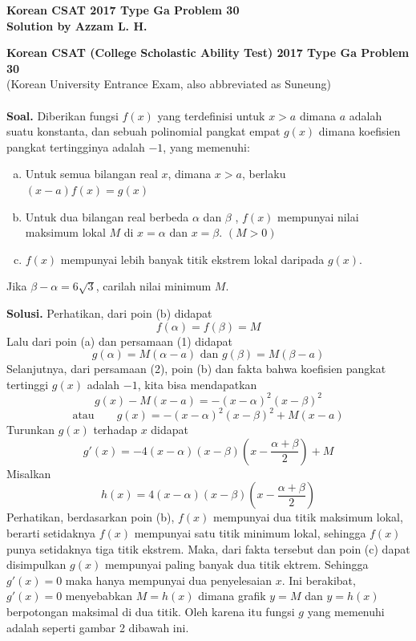 	\begin{center}
    \textbf{\Huge Korean CSAT 2017 Type Ga Problem 30}\\
    \textbf{\large Solution by Azzam L. H.}
\end{center}
 
	\begin{framed}
		\textbf{Korean CSAT (College Scholastic Ability Test) 2017 Type Ga Problem 30}\\ (Korean University Entrance Exam, also abbreviated as Suneung)\\
		\\
		\textbf{Soal. }Diberikan fungsi $f(x)$ yang  terdefinisi untuk $x>a$ dimana $a$ adalah suatu konstanta, dan sebuah polinomial pangkat empat $g(x)$ dimana koefisien pangkat tertingginya adalah $-1$, yang memenuhi:
		\begin{enumerate}[a)]
			\item Untuk semua bilangan real $x$, dimana $x>a$, berlaku $(x-a)f(x)=g(x)$
			
			\item
			Untuk dua bilangan real berbeda $\alpha$ dan $\beta$ , $f(x)$ mempunyai nilai\\ maksimum lokal $M$ di $x=\alpha$ dan $x=\beta$. $(M>0)$
			
			\item
			$f(x)$ mempunyai lebih banyak titik ekstrem lokal daripada $g(x)$. 
		\end{enumerate}
		Jika $\beta-\alpha=6 \sqrt{3}$, carilah nilai minimum $M$.
	\end{framed}
	
		\textbf{Solusi.} Perhatikan, dari poin (b) didapat \begin{equation}
		f(\alpha)=f(\beta)=M 
	\end{equation}    Lalu dari poin (a) dan persamaan (1) didapat 
	\begin{equation}
		g(\alpha)=M(\alpha-a) \text{ dan } g(\beta)=M(\beta-a)
	\end{equation}
	Selanjutnya, dari persamaan (2), poin (b) dan fakta bahwa koefisien pangkat tertinggi $g(x)$ adalah $-1$, kita bisa mendapatkan
	$$g(x)-M(x-a)=-(x-\alpha)^2(x-\beta)^2$$
	\begin{equation}
				\textrm{atau} \qquad g(x)=-(x-\alpha)^2(x-\beta)^2+M(x-a)
	\end{equation}
	Turunkan $g(x)$ terhadap $x$ didapat
	$$g'(x)=-4(x-\alpha)(x-\beta)\left( x-\frac{\alpha+\beta}{2} \right) +M$$
	Misalkan 
	\begin{equation}
		h(x)=4(x-\alpha)(x-\beta)\left( x-\frac{\alpha+\beta}{2} \right)
	\end{equation}
	Perhatikan, berdasarkan poin (b), $f(x)$ mempunyai dua titik maksimum lokal, berarti setidaknya $f(x)$ mempunyai satu titik minimum lokal, sehingga $f(x)$ punya setidaknya tiga titik ekstrem. Maka, dari fakta tersebut dan poin (c) dapat disimpulkan $g(x)$ mempunyai paling banyak dua titik ektrem. Sehingga $g'(x)=0$ maka hanya mempunyai dua penyelesaian $x$. Ini berakibat, $g'(x)=0$ menyebabkan $M=h(x)$ dimana grafik $y=M$ dan $y=h(x)$ berpotongan maksimal di dua titik. Oleh karena itu fungsi $g$ yang memenuhi adalah seperti gambar 2 dibawah ini. 
	
